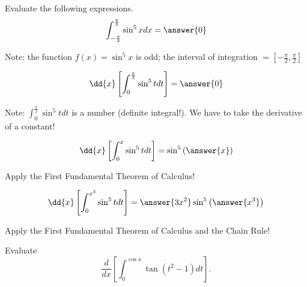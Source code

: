 \documentclass{ximera}
\author{Nela Lakos \and Kyle Parsons}
\begin{document}
\begin{exercise}

Evaluate the following expressions.
\begin{align*}
\int_{-\frac{\pi}{2}}^\frac{\pi}{2} \sin^5 x dx &= \answer{0}\\
\end{align*}
\begin{hint}
Note: the function $f(x)= \sin^5 x$ is odd; the interval of integration $=[-\frac{\pi}{2},\frac{\pi}{2}]$
\end{hint}
\begin{align*}
\dd{x}\left[\int_0^\frac{\pi}{2} \sin^5 t dt\right] &= \answer{0}\\
\end{align*}
\begin{hint}
Note: $\int_0^\frac{\pi}{2} \sin^5 t dt$ is a number (definite integral!).  We have to take the derivative of a constant!
\end{hint}
\begin{align*}
\dd{x}\left[\int_0^{x} \sin^5 t dt\right] &= \sin^5\left(\answer{x}\right)\\
\end{align*}
\begin{hint}
Apply the First Fundamental Theorem of Calculus!
\end{hint}
\begin{align*}
\dd{x}\left[\int_0^{x^3} \sin^5 t dt\right] &= \answer{3x^2}\sin^5\left(\answer{x^3}\right)\\
\end{align*}
\begin{hint}
Apply the First Fundamental Theorem of Calculus and the Chain Rule!
\end{hint}
Evaluate
\[
\frac{d}{dx}\left[\int_0^{\cos x} \tan\left(t^2-1\right) dt\right].
\]

\begin{multipleChoice}
\end{multipleChoice}

\end{exercise}
\end{document}
